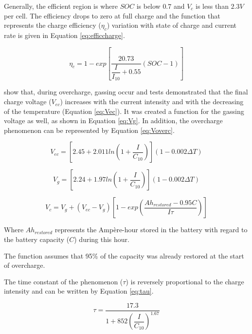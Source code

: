Generally, the efficient region is where $ SOC $ is below $ 0.7 $ and $ V_{c} $ is less than $2.3 V$ per cell. The efficiency drops to zero at full charge and the function that represents the charge efficiency ($ \eta_{c} $) variation with state of charge and current rate is given in Equation \ref{eq:efficcharge}.

\begin{equation}
\label{eq:efficcharge}
\eta_{c} = 1 - exp \left[ \dfrac{20.73}{\dfrac{I}{I_{10}}+0.55} (SOC-1) \right] 
\end{equation}

\cite{Copetti} show that, during overcharge, gassing occur and tests demonstrated that the final charge voltage ($ V_{ec} $) increases with the current intensity and with the decreasing of the temperature (Equation \ref{eq:Vec}). It was created a function for the gassing voltage as well, as shown in Equation \ref{eq:Vg}. In addition, the overcharge phenomenon can be represented by Equation \ref{eq:Voverc}.

\begin{equation}
\label{eq:Vec}
V_{ec} = \left[ 2.45 + 2.011 ln \left( 1+\dfrac{I}{C_{10}} \right)  \right] (1-0.002 \Delta T)
\end{equation}

\begin{equation}
\label{eq:Vg}
V_{g} = \left[ 2.24 + 1.97 ln \left( 1+\dfrac{I}{C_{10}} \right)  \right] (1-0.002 \Delta T)
\end{equation}

\begin{equation}
\label{eq:Voverc}
V_{c} = V_{g} + (V_{ec} - V_{g}) \left[ 1- exp \left( \dfrac{Ah_{restored}-0.95C}{I\tau}  \right)    \right] 
\end{equation}

Where $ Ah_{restored} $ represents the Ampère-hour stored in the battery with regard to the battery capacity ($ C $) during this hour.

The function assumes that 95\% of the capacity was already restored at the start of overcharge.

The time constant of the phenomenon ($ \tau $) is reversely proportional to the charge intensity and can be written by Equation \ref{eq:tau}.

\begin{equation}
\label{eq:tau}
\tau = \dfrac{17.3}{1+852 \left( \dfrac{I}{C_{10}} \right) ^{1.67} }
\end{equation}

